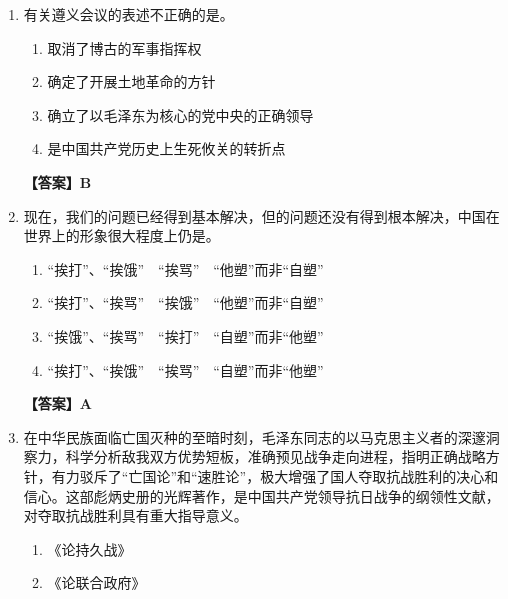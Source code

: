 \documentclass[UTF8,11pt,a4paper]{ctexart}
\begin{document}
\begin{enumerate}[label=\textbf{\arabic*.}, leftmargin=2.5em, itemsep=0.7em]
\begin{enumerate}[label=\Alph*., leftmargin=2em, itemsep=0.1em, topsep=0.15em]
\item 八七会议上否定了“陈独秀右倾错误”
\item 遵义会议结束了王明“左”倾冒险主义在中共中央的统治
\item 瓦窑堡会议确定建立抗日民族统一战线的方针政策
\item 十一届三中全会确立邓小平理论作为党的指导思想
\end{enumerate}
\textbf{【答案】D}
\item 有关遵义会议的表述不正确的是\allowbreak\underline{\hspace{4em}}。
\begin{enumerate}[label=\Alph*., leftmargin=2em, itemsep=0.1em, topsep=0.15em]
\item 取消了博古的军事指挥权
\item 确定了开展土地革命的方针
\item 确立了以毛泽东为核心的党中央的正确领导
\item 是中国共产党历史上生死攸关的转折点
\end{enumerate}
\textbf{【答案】B}
\item 现在，我们\allowbreak\underline{\hspace{4em}}的问题已经得到基本解决，但\allowbreak\underline{\hspace{4em}}的问题还没有得到根本解决，中国在世界上的形象很大程度上仍是\allowbreak\underline{\hspace{4em}}。
\begin{enumerate}[label=\Alph*., leftmargin=2em, itemsep=0.1em, topsep=0.15em]
\item “挨打”、“挨饿”　“挨骂”　“他塑”而非“自塑”
\item “挨打”、“挨骂”　“挨饿”　“他塑”而非“自塑”
\item “挨饿”、“挨骂”　“挨打”　“自塑”而非“他塑”
\item “挨打”、“挨饿”　“挨骂”　“自塑”而非“他塑”
\end{enumerate}
\textbf{【答案】A}
\item 在中华民族面临亡国灭种的至暗时刻，毛泽东同志的\allowbreak\underline{\hspace{4em}}以马克思主义者的深邃洞察力，科学分析敌我双方优势短板，准确预见战争走向进程，指明正确战略方针，有力驳斥了“亡国论”和“速胜论”，极大增强了国人夺取抗战胜利的决心和信心。这部彪炳史册的光辉著作，是中国共产党领导抗日战争的纲领性文献，对夺取抗战胜利具有重大指导意义。
\begin{enumerate}[label=\Alph*., leftmargin=2em, itemsep=0.1em, topsep=0.15em]
\item 《论持久战》
\item 《论联合政府》

\end{enumerate}
\end{enumerate}
\end{document}

